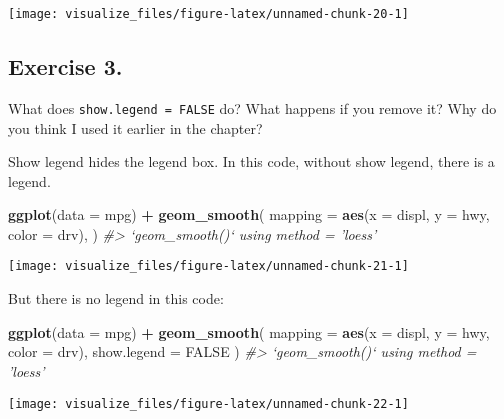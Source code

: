\documentclass[]{book}
\newenvironment{Shaded}{\begin{snugshade}}{\end{snugshade}}
\newcommand{\CommentTok}[1]{\textcolor[rgb]{0.56,0.35,0.01}{\textit{#1}}}
\newcommand{\DataTypeTok}[1]{\textcolor[rgb]{0.13,0.29,0.53}{#1}}
\newcommand{\KeywordTok}[1]{\textcolor[rgb]{0.13,0.29,0.53}{\textbf{#1}}}
\newcommand{\NormalTok}[1]{#1}
\newcommand{\OperatorTok}[1]{\textcolor[rgb]{0.81,0.36,0.00}{\textbf{#1}}}
\newcommand{\OtherTok}[1]{\textcolor[rgb]{0.56,0.35,0.01}{#1}}
\newcommand{\StringTok}[1]{\textcolor[rgb]{0.31,0.60,0.02}{#1}}
\theoremstyle{definition}
\theoremstyle{definition}
\theoremstyle{definition}
\theoremstyle{remark}
\begin{document}
\begin{center}\texttt{[image: visualize\_files/figure-latex/unnamed-chunk-20-1]} \end{center}

\hypertarget{exercise-3.-3}{%
\subsection{Exercise 3.}\label{exercise-3.-3}}

What does \texttt{show.legend\ =\ FALSE} do? What happens if you remove
it? Why do you think I used it earlier in the chapter?

Show legend hides the legend box. In this code, without show legend,
there is a legend.

\begin{Shaded}
\begin{Highlighting}[]
\KeywordTok{ggplot}\NormalTok{(}\DataTypeTok{data =}\NormalTok{ mpg) }\OperatorTok{+}
\StringTok{  }\KeywordTok{geom_smooth}\NormalTok{(}
    \DataTypeTok{mapping =} \KeywordTok{aes}\NormalTok{(}\DataTypeTok{x =}\NormalTok{ displ, }\DataTypeTok{y =}\NormalTok{ hwy, }\DataTypeTok{color =}\NormalTok{ drv),}
\NormalTok{  )}
\CommentTok{#> `geom_smooth()` using method = 'loess'}
\end{Highlighting}
\end{Shaded}

\begin{center}\texttt{[image: visualize\_files/figure-latex/unnamed-chunk-21-1]} \end{center}

But there is no legend in this code:

\begin{Shaded}
\begin{Highlighting}[]
\KeywordTok{ggplot}\NormalTok{(}\DataTypeTok{data =}\NormalTok{ mpg) }\OperatorTok{+}
\StringTok{  }\KeywordTok{geom_smooth}\NormalTok{(}
    \DataTypeTok{mapping =} \KeywordTok{aes}\NormalTok{(}\DataTypeTok{x =}\NormalTok{ displ, }\DataTypeTok{y =}\NormalTok{ hwy, }\DataTypeTok{color =}\NormalTok{ drv),}
    \DataTypeTok{show.legend =} \OtherTok{FALSE}
\NormalTok{  )}
\CommentTok{#> `geom_smooth()` using method = 'loess'}
\end{Highlighting}
\end{Shaded}

\begin{center}\texttt{[image: visualize\_files/figure-latex/unnamed-chunk-22-1]} \end{center}
\end{document}
